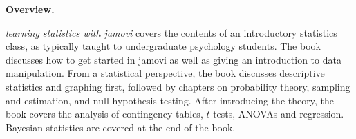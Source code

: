 

\clearpage
\newpage
\begin{center}
{\bf Overview.}
\end{center}

{\it learning statistics with jamovi} covers the contents of an introductory statistics class, as typically taught to undergraduate psychology students. The book discusses how to get started in jamovi as well as giving an introduction to data manipulation. From a statistical perspective, the book discusses descriptive statistics and graphing first, followed by chapters on probability theory, sampling and estimation, and null hypothesis testing. After introducing the theory, the book covers the analysis of contingency tables, $t$-tests, ANOVAs and regression. Bayesian statistics are covered at the end of the book. 

